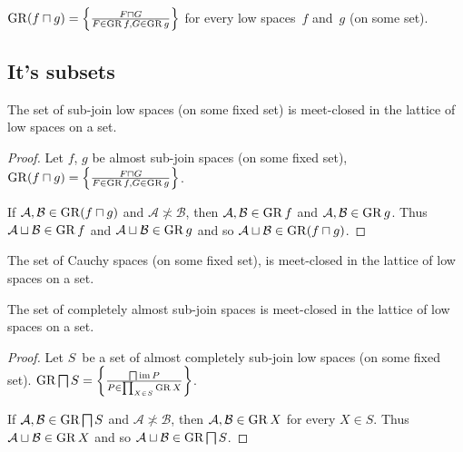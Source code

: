 \begin{cor}
$\operatorname{GR}(f\sqcap g) = \left\{ \frac{F\sqcap G}{F\in\operatorname{GR} f,G\in\operatorname{GR} g}\right\}$ for every low spaces~$f$ and~$g$ (on some set).
\end{cor}




\subsection{It's subsets}

\begin{prop}
The set of sub-join low spaces (on some fixed set) is meet-closed in the lattice of low spaces on a set.
\end{prop}

\begin{proof}
Let $f$, $g$ be almost sub-join spaces (on some fixed set), $\operatorname{GR}(f\sqcap g) = \left\{ \frac{F\sqcap G}{F\in\operatorname{GR} f,G\in\operatorname{GR} g}\right\}$.

If $\mathcal{A}, \mathcal{B} \in \operatorname{GR}(f\sqcap g)$ and $\mathcal{A}
\nasymp \mathcal{B}$, then $\mathcal{A}, \mathcal{B} \in \operatorname{GR} f$ and $\mathcal{A}, \mathcal{B} \in \operatorname{GR} g$.
Thus $\mathcal{A}\sqcup\mathcal{B}\in\operatorname{GR} f$ and $\mathcal{A}\sqcup\mathcal{B}\in\operatorname{GR} g$ and so
$\mathcal{A} \sqcup \mathcal{B} \in \operatorname{GR}(f\sqcap g)$.
\end{proof}

\begin{cor}
The set of Cauchy spaces (on some fixed set), is meet-closed in the lattice of low spaces on a set.
\end{cor}

\begin{prop}
The set of completely almost sub-join spaces is meet-closed in the lattice of low spaces on a set.
\end{prop}

\begin{proof}
Let $S$~be a set of almost completely sub-join low spaces (on some fixed set). $\operatorname{GR} \bigsqcap S = \left\{ \frac{ \bigsqcap
\operatorname{im} P }{ P \in \prod_{X \in S} \operatorname{GR} X}\right\}$.

If $\mathcal{A}, \mathcal{B} \in \operatorname{GR} \bigsqcap S$ and $\mathcal{A}
\nasymp \mathcal{B}$, then $\mathcal{A}, \mathcal{B} \in \operatorname{GR} X$ for
every $X \in S$. Thus $\mathcal{A} \sqcup \mathcal{B} \in \operatorname{GR} X$ and so
$\mathcal{A} \sqcup \mathcal{B} \in \operatorname{GR} \bigsqcap S$.
\end{proof}

